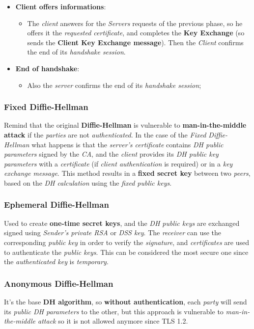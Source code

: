 \documentclass{article}
\begin{document}
\begin{itemize}
\begin{itemize}
\end{itemize}
\item \textbf{Client offers informations}:
\begin{itemize}
\item The \emph{client} answers for the \emph{Servers} requests of the previous phase, so he offers it the \emph{requested certificate}, and completes the \textbf{Key Exchange} (so sends the \textbf{Client Key Exchange message}). Then the \emph{Client} confirms the end of its \emph{handshake session}.
\end{itemize}
\item \textbf{End of handshake}:
\begin{itemize}
\item Also the \emph{server} confirms the end of its \emph{handshake session};
\end{itemize}
\end{itemize}
\subsubsection{Fixed Diffie-Hellman}
Remind that the original \textbf{Diffie-Hellman} is vulnerable to\textbf{ man-in-the-middle attack} if the \emph{parties} are not \emph{authenticated}. In the case of the \emph{Fixed Diffie-Hellman} what happens is that the \emph{server's certificate} contains \emph{DH public parameters} signed by the \emph{CA}, and the \emph{client} provides its \emph{DH public key parameters} with a \emph{certificate} (if \emph{client authentication} is required) or in a \emph{key exchange message}. This method results in a \textbf{fixed secret key} between two \emph{peers}, based on the \emph{DH calculation} using the \emph{fixed public keys}. 
\subsubsection{Ephemeral Diffie-Hellman}
Used to create \textbf{one-time secret keys}, and the \emph{DH public keys} are exchanged signed using \emph{Sender's private RSA} or \emph{DSS key}. The \emph{receiver} can use the corresponding \emph{public key} in order to verify the \emph{signature}, and \emph{certificates} are used to authenticate the \emph{public keys}. This can be considered the most secure one since the \emph{authenticated key} is \emph{temporary}. 
\subsubsection{Anonymous Diffie-Hellman}
It's the base \textbf{DH algorithm}, so \textbf{without authentication}, each \emph{party} will send its \emph{public DH parameters} to the other, but this approach is vulnerable to \emph{man-in-the-middle attack} so it is not allowed anymore since TLS 1.2. 
\end{document}

